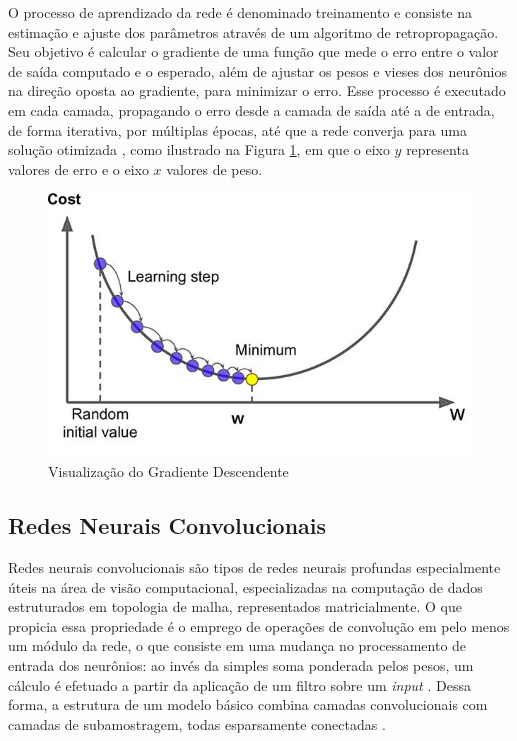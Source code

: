 O processo de aprendizado da rede é denominado treinamento e consiste na estimação e ajuste dos parâmetros através de um algoritmo de retropropagação. Seu objetivo é calcular o gradiente de uma função que mede o erro entre o valor de saída computado e o esperado, além de ajustar os pesos e vieses dos neurônios na direção oposta ao gradiente, para minimizar o erro. Esse processo é executado em cada camada, propagando o erro desde a camada de saída até a de entrada, de forma iterativa, por múltiplas épocas, até que a rede converja para uma solução otimizada \cite{deeplearningbook}, como ilustrado na Figura \ref{fig:gradientdescent}, em que o eixo $y$ representa valores de erro e o eixo $x$ valores de peso.

\begin{figure}[H]
	\caption{\label{fig:gradientdescent}Visualização do Gradiente Descendente}
    \begin{center}
    \includegraphics[width=1\linewidth]{images/gradientdescent.jpg}
	\end{center}
\end{figure}


\subsection{Redes Neurais Convolucionais}

Redes neurais convolucionais são tipos de redes neurais profundas especialmente úteis na área de visão computacional, especializadas na computação de dados estruturados em topologia de malha, representados matricialmente. O que propicia essa propriedade é o emprego de operações de convolução em pelo menos um módulo da rede, o que consiste em uma mudança no processamento de entrada dos neurônios: ao invés da simples soma ponderada pelos pesos, um cálculo é efetuado a partir da aplicação de um filtro sobre um \textit{input} \cite{deeplearningbook}. Dessa forma, a estrutura de um modelo básico combina camadas convolucionais com camadas de subamostragem, todas esparsamente conectadas \cite{reviewdeep}.

